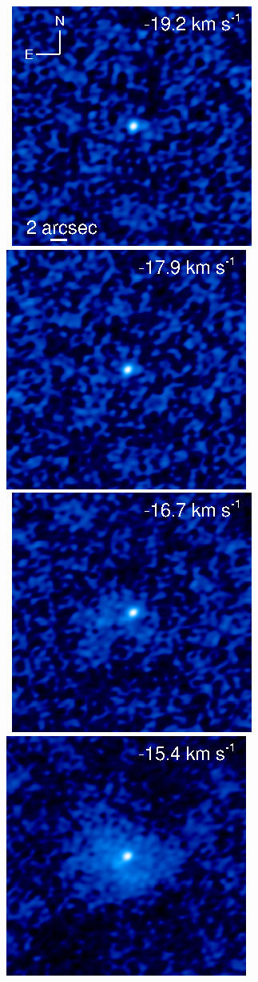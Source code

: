 \documentclass[manuscript]{aastex}
\begin{document}
\begin{figure}[hbt!]
\mbox{
          \includegraphics[]{f2.eps}
          \includegraphics[]{f3.eps}
          }
\\
\mbox{
          \includegraphics[]{f4.eps}
          \includegraphics[]{f5.eps}
}
\end{figure}
\end{document}
